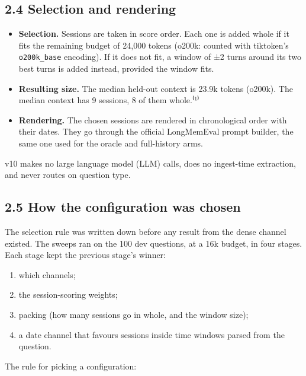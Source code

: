 \documentclass[11pt]{article}
\providecommand{\tightlist}{\setlength{\itemsep}{0pt}\setlength{\parskip}{0pt}}
\begin{document}
\hypertarget{selection-and-rendering}{%
\subsection{2.4 Selection and rendering}\label{selection-and-rendering}}

\begin{itemize}
\tightlist
\item
  \textbf{Selection.} Sessions are taken in score order. Each one is added whole if it fits the remaining budget
  of 24,000 tokens (o200k: counted with tiktoken's \texttt{o200k\_base} encoding). If it does not fit, a window of
  ±2 turns around its two best turns is added instead, provided the window fits.
\item
  \textbf{Resulting size.} The median held-out context is 23.9k tokens (o200k). The median context has 9
  sessions, 8 of them whole.⁽¹⁾
\item
  \textbf{Rendering.} The chosen sessions are rendered in chronological order with their dates. They go through
  the official LongMemEval prompt builder, the same one used for the oracle and full-history arms.
\end{itemize}

v10 makes no large language model (LLM) calls, does no ingest-time extraction, and never routes on question type.

\hypertarget{how-the-configuration-was-chosen}{%
\subsection{2.5 How the configuration was chosen}\label{how-the-configuration-was-chosen}}

The selection rule was written down before any result from the dense channel existed. The sweeps ran on the
100 dev questions, at a 16k budget, in four stages. Each stage kept the previous stage's winner:

\begin{enumerate}
\def\labelenumi{\arabic{enumi}.}
\tightlist
\item
  which channels;
\item
  the session-scoring weights;
\item
  packing (how many sessions go in whole, and the window size);
\item
  a date channel that favours sessions inside time windows parsed from the question.
\end{enumerate}

The rule for picking a configuration:
\end{document}
